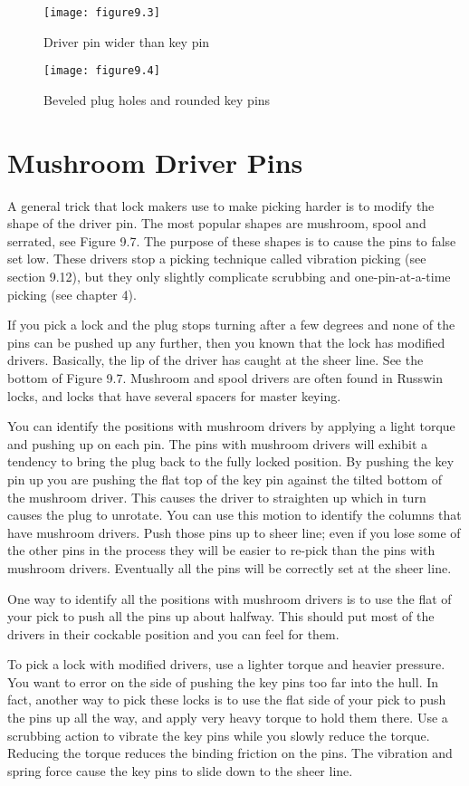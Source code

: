 \begin{figure}
    \texttt{[image: figure9.3]}
    \caption{Driver pin wider than key pin}
\end{figure}

\begin{figure}
    \texttt{[image: figure9.4]}
    \caption{Beveled plug holes and rounded key pins}
\end{figure}

\section{Mushroom Driver Pins}
A general trick that lock makers use to make picking harder is to modify the shape of the driver pin.
The most popular shapes are mushroom, spool and serrated, see Figure 9.7.
The purpose of these shapes is to cause the pins to false set low. These drivers stop a picking technique called vibration picking (see section 9.12), but they only slightly complicate scrubbing and one-pin-at-a-time picking (see chapter 4).

If you pick a lock and the plug stops turning after a few degrees and none of the pins
can be pushed up any further, then you known that the lock has modified drivers. Basically,
the lip of the driver has caught at the sheer line. See the bottom of Figure 9.7. Mushroom
and spool drivers are often found in Russwin locks, and locks that have several spacers for
master keying.

You can identify the positions with mushroom drivers by applying a light torque and
pushing up on each pin. The pins with mushroom drivers will exhibit a tendency to bring
the plug back to the fully locked position. By pushing the key pin up you are pushing the
flat top of the key pin against the tilted bottom of the mushroom driver. This causes the
driver to straighten up which in turn causes the plug to unrotate. You can use this motion
to identify the columns that have mushroom drivers. Push those pins up to sheer line; even
if you lose some of the other pins in the process they will be easier to re-pick than the pins
with mushroom drivers. Eventually all the pins will be correctly set at the sheer line.

One way to identify all the positions with mushroom drivers is to use the flat of your pick
to push all the pins up about halfway. This should put most of the drivers in their cockable
position and you can feel for them.

To pick a lock with modified drivers, use a lighter torque and heavier pressure. You want
to error on the side of pushing the key pins too far into the hull. In fact, another way to
pick these locks is to use the flat side of your pick to push the pins up all the way, and apply
very heavy torque to hold them there. Use a scrubbing action to vibrate the key pins while
you slowly reduce the torque. Reducing the torque reduces the binding friction on the pins.
The vibration and spring force cause the key pins to slide down to the sheer line.

